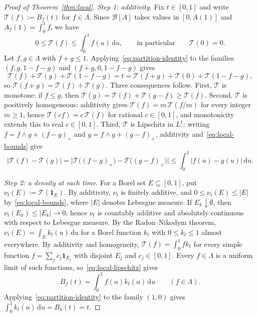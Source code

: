 \documentclass[11pt]{article}
\theoremstyle{definition}
\theoremstyle{remark}
\newcommand{\dd}{\,\mathrm d}
\newcommand{\ind}{\mathbf 1}
\begin{document}
\begin{proof}[Proof of Theorem~\ref{thm:local}]
\emph{Step 1: additivity.}
Fix $t\in[0,1]$ and write $\mathcal T(f):=B_f(t)$ for $f\in\Lambda$.
Since $\mathcal B[A]$ takes values in $[0,A(1)]$ and $A_f(1)=\int_0^1f$, we have
\begin{equation}\label{eq:local-bounds}
 0\le \mathcal T(f)\le\int_0^1f(u)\dd u,
 \qquad\text{in particular}\qquad
 \mathcal T(0)=0.
\end{equation}
Let $f,g\in\Lambda$ with $f+g\le1$.
Applying~\eqref{eq:partition-identity} to the families $(f,g,1-f-g)$ and $(f+g,0,1-f-g)$ gives
\[
 \mathcal T(f)+\mathcal T(g)+\mathcal T(1-f-g)=t=\mathcal T(f+g)+\mathcal T(0)+\mathcal T(1-f-g),
\]
so $\mathcal T(f+g)=\mathcal T(f)+\mathcal T(g)$.
Three consequences follow.
First, $\mathcal T$ is monotone: if $f\le g$, then $\mathcal T(g)=\mathcal T(f)+\mathcal T(g-f)\ge\mathcal T(f)$.
Second, $\mathcal T$ is positively homogeneous: additivity gives $\mathcal T(f)=m\,\mathcal T(f/m)$ for every integer $m\ge1$, hence $\mathcal T(cf)=c\,\mathcal T(f)$ for rational $c\in[0,1]$, and monotonicity extends this to real $c\in[0,1]$.
Third, $\mathcal T$ is Lipschitz in $L^1$: writing $f=f\wedge g+(f-g)_+$ and $g=f\wedge g+(g-f)_+$, additivity and~\eqref{eq:local-bounds} give
\begin{equation}\label{eq:local-lipschitz}
 |\mathcal T(f)-\mathcal T(g)|
 =\bigl|\mathcal T\bigl((f-g)_+\bigr)-\mathcal T\bigl((g-f)_+\bigr)\bigr|
 \le\int_0^1|f(u)-g(u)|\dd u.
\end{equation}

\emph{Step 2: a density at each time.}
For a Borel set $E\subseteq[0,1]$, put $\nu_t(E):=\mathcal T(\ind_E)$.
By additivity, $\nu_t$ is finitely additive, and $0\le\nu_t(E)\le|E|$ by~\eqref{eq:local-bounds}, where $|E|$ denotes Lebesgue measure.
If $E_k\downarrow\emptyset$, then $\nu_t(E_k)\le|E_k|\to0$; hence $\nu_t$ is countably additive and absolutely continuous with respect to Lebesgue measure.
By the Radon--Nikodym theorem, $\nu_t(E)=\int_Ek_t(u)\dd u$ for a Borel function $k_t$ with $0\le k_t\le1$ almost everywhere.
By additivity and homogeneity, $\mathcal T(f)=\int_0^1fk_t$ for every simple function $f=\sum_jc_j\ind_{E_j}$ with disjoint $E_j$ and $c_j\in[0,1]$.
Every $f\in\Lambda$ is a uniform limit of such functions, so~\eqref{eq:local-lipschitz} gives
\begin{equation}\label{eq:local-density}
 B_f(t)=\int_0^1f(u)k_t(u)\dd u
 \qquad(f\in\Lambda).
\end{equation}
Applying~\eqref{eq:partition-identity} to the family $(1,0)$ gives $\int_0^1k_t(u)\dd u=B_1(t)=t$.


\end{proof}
\end{document}
